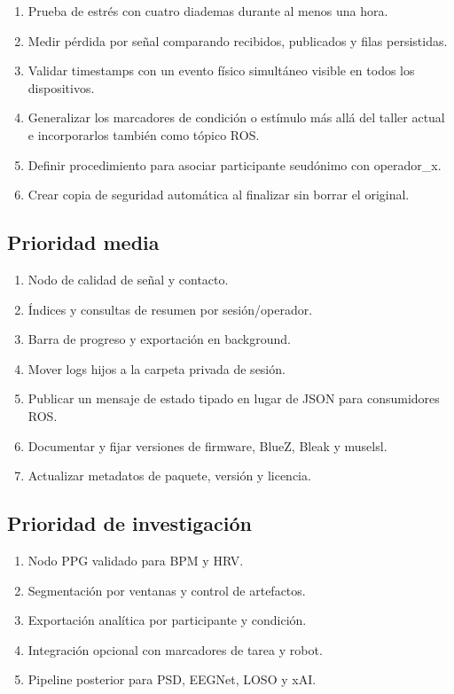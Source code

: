 \documentclass[11pt,a4paper]{article}
\begin{document}
\begin{enumerate}
\item Prueba de estrés con cuatro diademas durante al menos una hora.
\item Medir pérdida por señal comparando recibidos, publicados y filas persistidas.
\item Validar timestamps con un evento físico simultáneo visible en todos los dispositivos.
\item Generalizar los marcadores de condición o estímulo más allá del taller actual e
incorporarlos también como tópico ROS.
\item Definir procedimiento para asociar participante seudónimo con {\ttfamily\small operador\_x}.
\item Crear copia de seguridad automática al finalizar sin borrar el original.
\end{enumerate}

\subsection{Prioridad media}

\begin{enumerate}
\item Nodo de calidad de señal y contacto.
\item Índices y consultas de resumen por sesión/operador.
\item Barra de progreso y exportación en background.
\item Mover logs hijos a la carpeta privada de sesión.
\item Publicar un mensaje de estado tipado en lugar de JSON para consumidores ROS.
\item Documentar y fijar versiones de firmware, BlueZ, Bleak y {\ttfamily\small muselsl}.
\item Actualizar metadatos de paquete, versión y licencia.
\end{enumerate}

\subsection{Prioridad de investigación}

\begin{enumerate}
\item Nodo PPG validado para BPM y HRV.
\item Segmentación por ventanas y control de artefactos.
\item Exportación analítica por participante y condición.
\item Integración opcional con marcadores de tarea y robot.
\item Pipeline posterior para PSD, EEGNet, LOSO y xAI.
\end{enumerate}
\end{document}

